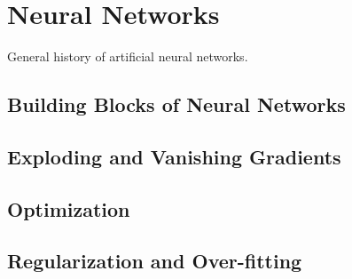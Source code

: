 \chapter{Neural Networks}
General history of artificial neural networks.

\section{Building Blocks of Neural Networks}

\section{Exploding and Vanishing Gradients}

\section{Optimization}

\section{Regularization and Over-fitting}


\clearpage